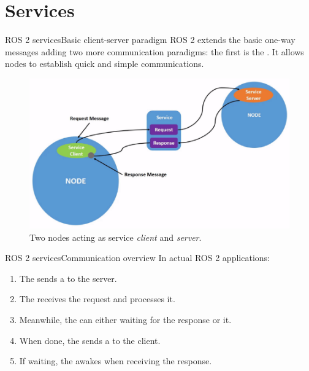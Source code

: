 
\section{Services}
\graphicspath{{figs/section2/}}

\begin{frame}{ROS 2 services}{Basic client-server paradigm}
  ROS 2 extends the basic one-way messages adding two more communication paradigms: the first is the . It allows nodes to establish quick and simple  communications.
  \begin{figure}
    \centering
    \includegraphics[scale=.33]{ros2Srv.png}
    \caption{Two nodes acting as service \emph{client} and \emph{server}.}
    \label{fig:ros2srv}
  \end{figure}
\end{frame}
\begin{frame}{ROS 2 services}{Communication overview}
  In actual ROS 2 applications:
  \begin{enumerate}
    \item The  sends a  to the server.
    \item The  receives the request and processes it.
    \item Meanwhile, the  can either  waiting for the response or  it.
    \item When done, the  sends a  to the client.
    \item If waiting, the  awakes when receiving the response.
  \end{enumerate}
\end{frame}
